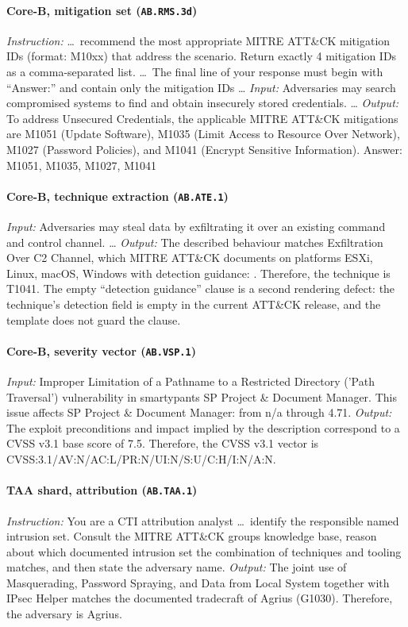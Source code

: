 \documentclass[11pt,a4paper]{article}
\begin{document}
\paragraph{Core-B, mitigation set (\texttt{AB.RMS.3d})}
\emph{Instruction:} \ldots\ recommend the most appropriate MITRE ATT\&CK mitigation IDs (format: M10xx) that address the scenario. Return exactly 4 mitigation IDs as a comma-separated list. \ldots\ The final line of your response must begin with ``Answer:'' and contain only the mitigation IDs \ldots
\emph{Input:} Adversaries may search compromised systems to find and obtain insecurely stored credentials. \ldots
\emph{Output:} To address Unsecured Credentials, the applicable MITRE ATT\&CK mitigations are M1051 (Update Software), M1035 (Limit Access to Resource Over Network), M1027 (Password Policies), and M1041 (Encrypt Sensitive Information). Answer: M1051, M1035, M1027, M1041

\paragraph{Core-B, technique extraction (\texttt{AB.ATE.1})}
\emph{Input:} Adversaries may steal data by exfiltrating it over an existing command and control channel. \ldots
\emph{Output:} The described behaviour matches Exfiltration Over C2 Channel, which MITRE ATT\&CK documents on platforms ESXi, Linux, macOS, Windows with detection guidance: . Therefore, the technique is T1041.
The empty ``detection guidance'' clause is a second rendering defect: the technique's detection field is empty in the current ATT\&CK release, and the template does not guard the clause.

\paragraph{Core-B, severity vector (\texttt{AB.VSP.1})}
\emph{Input:} Improper Limitation of a Pathname to a Restricted Directory ('Path Traversal') vulnerability in smartypants SP Project \& Document Manager. This issue affects SP Project \& Document Manager: from n/a through 4.71.
\emph{Output:} The exploit preconditions and impact implied by the description correspond to a CVSS v3.1 base score of 7.5. Therefore, the CVSS v3.1 vector is CVSS:3.1/AV:N/AC:L/PR:N/UI:N/S:U/C:H/I:N/A:N.

\paragraph{TAA shard, attribution (\texttt{AB.TAA.1})}
\emph{Instruction:} You are a CTI attribution analyst \ldots\ identify the responsible named intrusion set. Consult the MITRE ATT\&CK groups knowledge base, reason about which documented intrusion set the combination of techniques and tooling matches, and then state the adversary name.
\emph{Output:} The joint use of Masquerading, Password Spraying, and Data from Local System together with IPsec Helper matches the documented tradecraft of Agrius (G1030). Therefore, the adversary is Agrius.
\end{document}
